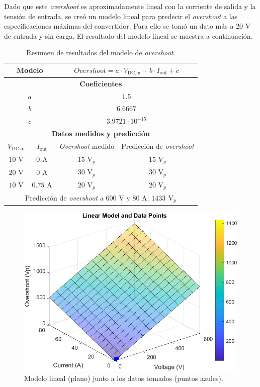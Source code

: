 Dado que este \textit{overshoot} es aproximadamente lineal con la corriente de salida y la tensión de entrada, se creó un modelo lineal para predecir el \textit{overshoot} a las especificaciones máximas del convertidor. Para ello se tomó un dato más a 20 V de entrada y sin carga. El resultado del modelo lineal se muestra a continuación.

\begin{table}[H]
	\centering
	\begin{tabular}{|c|c|c|c|}
		\hline
		\multicolumn{2}{|c|}{\textbf{Modelo}} & \multicolumn{2}{|c|}{$Overshoot = a \cdot V_{\text{DC,in}} + b \cdot I_{\text{out}} + c$} \\
		\hline
		\multicolumn{4}{|c|}{\textbf{Coeficientes}} \\
		\hline
		\multicolumn{2}{|c|}{$a$} & \multicolumn{2}{c|}{$1.5$} \\
		\multicolumn{2}{|c|}{$b$} & \multicolumn{2}{c|}{$6.6667$} \\
		\multicolumn{2}{|c|}{$c$} & \multicolumn{2}{c|}{$3.9721 \cdot 10^{-15}$} \\
		\hline
		\multicolumn{4}{|c|}{\textbf{Datos medidos y predicción}} \\
		\hline
		{$V_{\text{DC,in}}$} & $I_{\text{out}}$ & \textit{Overshoot} medido & Predicción de \textit{overshoot}\\
		\hline
		{$10$ V} & $0$ A & $15$ $\text{V}_p$ & $15$ $\text{V}_p$\\
		{$20$ V} & $0$ A & $30$ $\text{V}_p$ & $30$ $\text{V}_p$\\
		{$10$ V} & $0.75$ A & $20$ $\text{V}_p$ & $20$ $\text{V}_p$ \\
		\hline
		\multicolumn{4}{|c|}{Predicción de \textit{overshoot} a $600$ V y $80$ A: {\color{red}\textbf{$1433$ $\text{V}_p$}}} \\
		\hline
	\end{tabular}
	\caption{Resumen de resultados del modelo de \textit{overshoot}.}
\end{table}



\begin{figure}[H]
	\centering
	\includegraphics[width=0.7\linewidth]{fig/overshootInicial3}
	\caption{Modelo lineal (plano) junto a los datos tomados (puntos azules).}
\end{figure}

